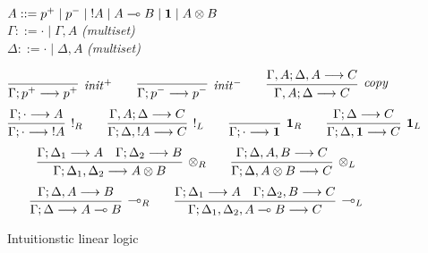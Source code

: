 \begin{figure}[t]
\begin{tabbing}
\quad $A ::= p^+ \mid p^- \mid {!}A \mid A \multimap B \mid \mathbf{1} \mid A \otimes B$\\
\quad $\Gamma ::= \cdot \mid \Gamma, A$ \qquad \= {\it (multiset)}\\
\quad $\Delta ::= \cdot \mid \Delta, A$ \> {\it (multiset)}\\
\end{tabbing}
%
%
\quad {}
\[
\infer[{\it init}^+]
{\seq{\Gamma}{p^+}{p^+}}
{}
\qquad
\infer[{\it init}^-]
{\seq{\Gamma}{p^-}{p^-}}
{}
\qquad
\infer[{\it copy}]
{\seq{\Gamma, A}{\Delta}{C}}
{\seq{\Gamma, A}{\Delta, A}{C}}
%
\]\[
%
\infer[{!}_R]
{\seq{\Gamma}{\cdot}{{!}A}}
{\seq{\Gamma}{\cdot}{A}}
\qquad
\infer[{!}_L]
{\seq{\Gamma}{\Delta, {!}A}{C}}
{\seq{\Gamma, A}{\Delta}{C}}
\qquad
\infer[\one_R]
{\seq{\Gamma}{\cdot}{\one}}
{}
\qquad
\infer[\one_L]
{\seq{\Gamma}{\Delta, \one}{C}}
{\seq{\Gamma}{\Delta}{C}}
\]\[
%
\infer[{\tensor}_R]
{\seq{\Gamma}{\Delta_1,\Delta_2}{A \tensor B}}
{\seq{\Gamma}{\Delta_1}{A}
 &
 \seq{\Gamma}{\Delta_2}{B}}
\qquad
\infer[{\tensor}_L]
{\seq{\Gamma}{\Delta, A \tensor B}{C}}
{\seq{\Gamma}{\Delta, A, B}{C}}
\]\[
%
\infer[{\lolli}_R]
{\seq{\Gamma}{\Delta}{A \lolli B}}
{\seq{\Gamma}{\Delta, A}{B}}
\qquad
\infer[{\lolli}_L]
{\seq{\Gamma}{\Delta_1,\Delta_2, A \lolli B}{C}}
{\seq{\Gamma}{\Delta_1}{A}
 &
 \seq{\Gamma}{\Delta_2, B}{C}}
%
\]
\caption{Intuitionstic linear logic}
\label{fig:linear}
\end{figure}
